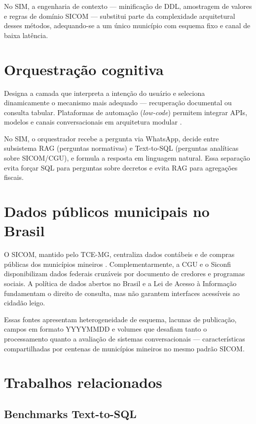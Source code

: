 No SIM, a engenharia de contexto --- minificação de DDL, amostragem de valores e regras de domínio SICOM --- substitui parte da complexidade arquitetural desses métodos, adequando-se a um único município com esquema fixo e canal de baixa latência.

\section{Orquestração cognitiva}

Designa a camada que interpreta a intenção do usuário e seleciona dinamicamente o mecanismo mais adequado --- recuperação documental ou consulta tabular. Plataformas de automação (\textit{low-code}) permitem integrar APIs, modelos e canais conversacionais em arquitetura modular \cite{Russell2020AIMA}.

No SIM, o orquestrador recebe a pergunta via WhatsApp, decide entre subsistema RAG (perguntas normativas) e Text-to-SQL (perguntas analíticas sobre SICOM/CGU), e formula a resposta em linguagem natural. Essa separação evita forçar SQL para perguntas sobre decretos e evita RAG para agregações fiscais.

\section{Dados públicos municipais no Brasil}

O SICOM, mantido pelo TCE-MG, centraliza dados contábeis e de compras públicas dos municípios mineiros \cite{TCEMG_SICOM,Lei2024SICOM}. Complementarmente, a CGU e o Siconfi \cite{STN_SiconfiAPI,CGU_Transparencia} disponibilizam dados federais cruzáveis por documento de credores e programas sociais. A política de dados abertos no Brasil \cite{Brasil2016DadosAbertos} e a Lei de Acesso à Informação \cite{Lei2012LAI} fundamentam o direito de consulta, mas não garantem interfaces acessíveis ao cidadão leigo.

Essas fontes apresentam heterogeneidade de esquema, lacunas de publicação, campos em formato YYYYMMDD e volumes que desafiam tanto o processamento quanto a avaliação de sistemas conversacionais --- características compartilhadas por centenas de municípios mineiros no mesmo padrão SICOM.

\section{Trabalhos relacionados}

\subsection{Benchmarks Text-to-SQL}


